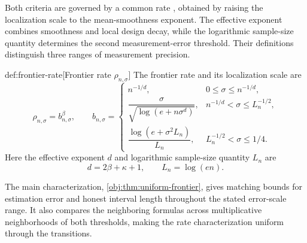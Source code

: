Both criteria are governed by a common rate , obtained by raising the localization scale  to the mean-smoothness exponent. The effective exponent  combines smoothness and local design decay, while the logarithmic sample-size quantity  determines the second measurement-error threshold. Their definitions distinguish three ranges of measurement precision.

\begin{definitionv}{def:frontier-rate}[Frontier rate \(\rho_{n,\sigma}\)]
The frontier rate and its localization scale are
\[
\rho_{n,\sigma}=b_{n,\sigma}^{\beta},
\qquad
b_{n,\sigma}=
\begin{cases}
n^{-1/d},&0\le\sigma\le n^{-1/d},\\[2pt]
\dfrac{\sigma}{\sqrt{\log(e+n\sigma^d)}},
&n^{-1/d}<\sigma\le L_n^{-1/2},\\[6pt]
\dfrac{\log(e+\sigma^2L_n)}{L_n},
&L_n^{-1/2}<\sigma\le1/4.
\end{cases}
\]
Here the effective exponent \(d\) and logarithmic sample-size quantity \(L_n\) are
\[
d=2\beta+\kappa+1,
\qquad
L_n=\log(en).
\]
\end{definitionv}

The main characterization, \cref{obj:thm:uniform-frontier}, gives matching bounds for estimation error and honest interval length throughout the stated error-scale range. It also compares the neighboring formulas across multiplicative neighborhoods of both thresholds, making the rate characterization uniform through the transitions.


